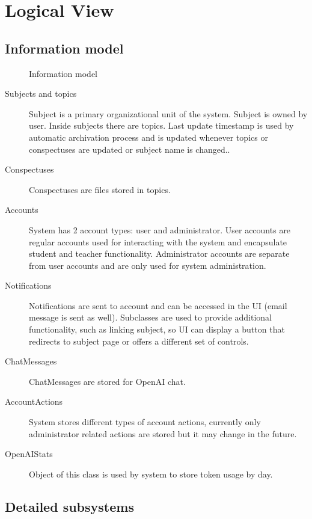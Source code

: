 \documentclass[
    english, %
]{VUMIFPSkursinis}
\begin{document}
\section{Logical View}

\subsection{Information model}

\begin{figure}[ht]
    \centering
    
    \label{informational-model}
    \caption{Information model}
\end{figure}

\begin{description}
    \item[Subjects and topics] Subject is a primary organizational unit of the system. Subject is owned by user. Inside subjects there are topics. Last update timestamp is used by automatic archivation process and is updated whenever topics or conspectuses are updated or subject name is changed..
    \item[Conspectuses] Conspectuses are files stored in topics.
    \item[Accounts] System has 2 account types: user and administrator. User accounts are regular accounts used for interacting with the system and encapsulate student and teacher functionality. Administrator accounts are separate from user accounts and are only used for system administration.
    \item[Notifications] Notifications are sent to account and can be accessed in the UI (email message is sent as well). Subclasses are used to provide additional functionality, such as linking subject, so UI can display a button that redirects to subject page or offers a different set of controls.
    \item[ChatMessages] ChatMessages are stored for OpenAI chat.
    \item[AccountActions] System stores different types of account actions, currently only administrator related actions are stored but it may change in the future.
    \item[OpenAIStats] Object of this class is used by system to store token usage by day.
\end{description}

\subsection{Detailed subsystems}
\end{document}
